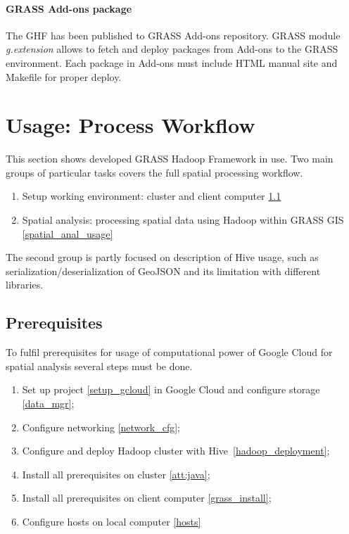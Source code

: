 \documentclass[a4paper,12pt,oneside]{report}
\begin{document}

	\paragraph{GRASS Add-ons package} The GHF has been published to GRASS Add-ons
	repository. GRASS module \textit{g.extension} allows to fetch and deploy packages
	from Add-ons to the GRASS environment. Each package in Add-ons must include HTML
	manual site and Makefile for proper deploy. 
	
	
	
	\section{Usage: Process Workflow}\label{sec:usage_spatial}
	This section shows  developed GRASS Hadoop Framework in use. Two main groups of particular tasks covers the full spatial processing workflow.
	\begin{enumerate}
	\item Setup working environment: cluster and client computer \ref{prereq}
	\item Spatial analysis: processing spatial data using Hadoop within GRASS GIS \ref{spatial_anal_usage}
	\end{enumerate}
	The second group is partly focused on description of
	Hive usage, such as serialization/deserialization of GeoJSON
	and its limitation with different libraries.
	
	\subsection{Prerequisites}\label{prereq}
	To fulfil prerequisites for usage of computational power of Google Cloud for spatial analysis several steps must be done.
	

	\begin{enumerate}
	\item Set up project \ref{setup_gcloud} in Google Cloud and configure storage \ref{data_mgr};
	\item Configure networking \ref{network_cfg};
	\item Configure and deploy Hadoop cluster with Hive\ \ref{hadoop_deployment};
	\item Install all prerequisites on cluster \ref{att:java};
	\item Install all prerequisites on client computer \ref{grass_install};
	\item Configure hosts on local computer \ref{hosts}
	\end{enumerate}
\end{document}
